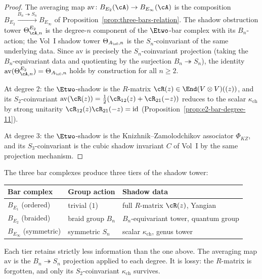 \begin{proof}
The averaging map $\mathrm{av} \colon B_{E_2}(\cA) \to B_{E_\infty}(\cA)$
is the composition $B_{E_2} \xrightarrow{B_n \twoheadrightarrow S_n}
B_{E_\infty}$ of Proposition~\ref{prop:three-bars-relation}. The
shadow obstruction tower $\Theta^{E_2}_{\cA, n}$ is the degree-$n$
component of the $\Etwo$-bar complex with its $B_n$-action; the
Vol~I shadow tower $\Theta_{A_\cC, n}$ is the $S_n$-coinvariant of
the same underlying data. Since $\mathrm{av}$ is precisely the
$S_n$-coinvariant projection (taking the $B_n$-equivariant data and
quotienting by the surjection $B_n \twoheadrightarrow S_n$), the
identity $\mathrm{av}(\Theta^{E_2}_{\cA, n}) = \Theta_{A_\cC, n}$
holds by construction for all $n \geq 2$.

At degree $2$: the $\Etwo$-shadow is the $R$-matrix
$\cR(z) \in \End(V \otimes V)((z))$, and its $S_2$-coinvariant
$\mathrm{av}(\cR(z)) = \frac{1}{2}(\cR_{12}(z) + \cR_{21}(-z))$
reduces to the scalar $\kappa_{\mathrm{ch}}$ by strong unitarity
$\cR_{12}(z)\cR_{21}(-z) = \mathrm{id}$
(Proposition~\ref{prop:e2-bar-degree-11}).

At degree $3$: the $\Etwo$-shadow is the Knizhnik--Zamolodchikov
associator $\Phi_{KZ}$, and its $S_3$-coinvariant is the cubic
shadow invariant $C$ of Vol~I by the same projection mechanism.
\end{proof}

\begin{remark}
\label{rem:three-shadow-tiers}
The three bar complexes produce three tiers of the shadow tower:
\begin{center}
\renewcommand{\arraystretch}{1.2}
\begin{tabular}{lll}
 \toprule
 Bar complex & Group action & Shadow data \\
 \midrule
 $B_{E_1}$ (ordered) & trivial ($1$) & full $R$-matrix $\cR(z)$, Yangian \\
 $B_{E_2}$ (braided) & braid group $B_n$ & $B_n$-equivariant tower, quantum group \\
 $B_{E_\infty}$ (symmetric) & symmetric $S_n$ & scalar $\kappa_{\mathrm{ch}}$, genus tower \\
 \bottomrule
\end{tabular}
\end{center}
Each tier retains strictly less information than the one above.
The averaging map $\mathrm{av}$ is the $B_n \twoheadrightarrow S_n$
projection applied to each degree. It is lossy: the $R$-matrix is
forgotten, and only its $S_2$-coinvariant $\kappa_{\mathrm{ch}}$
survives.
\end{remark}

